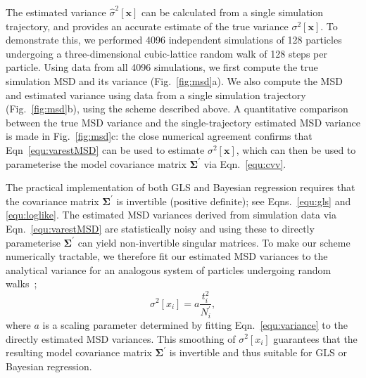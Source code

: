 \documentclass[reprint,superscriptaddress,nobibnotes,amsmath,amssymb,aps,prx,hidelinks,linenumbers]{revtex4-2}
\newcommand{\oMSD}{\ensuremath{\bm{x}}}
\newcommand{\oMSDi}{\ensuremath{x_i}}
\newcommand{\nind}[1]{\ensuremath{N^\prime_{#1}}}
\newcommand{\var}[1]{\ensuremath{\sigma^2[#1]}}
\newcommand{\varest}[1]{\ensuremath{\widehat{\sigma}^2[#1]}}
\begin{document}
The estimated variance $\varest{\oMSD}$ can be calculated from a single simulation trajectory, and provides an accurate estimate of the true variance $\var{\oMSD}$.
To demonstrate this, we performed \num{4096} independent simulations of \num{128} particles undergoing a three-dimensional cubic-lattice random walk of \num{128} steps per particle.
Using data from all \num{4096} simulations, we first compute the true simulation MSD and its variance (Fig.~\ref{fig:msd}a).
We also compute the MSD and estimated variance using data from a single simulation trajectory (Fig.~\ref{fig:msd}b), using the scheme described above.
A quantitative comparison between the true MSD variance and the single-trajectory estimated MSD variance is made in Fig.~\ref{fig:msd}c: the close numerical agreement confirms that Eqn~\ref{equ:varestMSD} can be used to estimate $\var{\oMSD}$, which can then be used to parameterise the model covariance matrix $\mathbf{\Sigma^\prime}$ via Eqn.~\ref{equ:cvv}.
%
%

The practical implementation of both GLS and Bayesian regression requires that the covariance matrix $\mathbf{\Sigma^\prime}$ is invertible (positive definite); see Eqns.~\ref{equ:gls} and \ref{equ:loglike}.
The estimated MSD variances derived from simulation data via Eqn.~\ref{equ:varestMSD} are statistically noisy and using these to directly parameterise $\mathbf{\Sigma^\prime}$ can yield non-invertible singular matrices.
To make our scheme numerically tractable, we therefore fit our estimated MSD variances to the analytical variance for an analogous system of particles undergoing random walks~\cite{smith_random_1996};
%
\begin{equation}
    \var{\oMSDi} = a\frac{t^2_i}{\nind{i}},
    \label{equ:variance}
\end{equation}
%
where $a$ is a scaling parameter determined by fitting Eqn.~\ref{equ:variance} to the directly estimated MSD variances.
This smoothing of $\var{\oMSDi}$ guarantees that the resulting model covariance matrix $\mathbf{\Sigma^\prime}$ is invertible and thus suitable for GLS or Bayesian regression.
\end{document}
